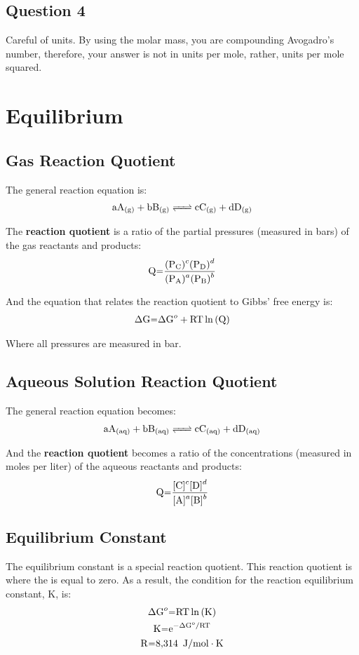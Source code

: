 \documentclass{article}
\begin{document}
\subsection*{Question 4}

Careful of units. By using the molar mass, you are compounding Avogadro's
number, therefore, your answer is not in units per mole, rather, units per mole
squared.

\section{Equilibrium}

\subsection{Gas Reaction Quotient}

The general reaction equation is:
\begin{gather*}
\ce{aA_{(g)} + bB_{(g)} <=> cC_{(g)} + dD_{(g)}}
\end{gather*}

The \textbf{reaction quotient} is a ratio of the partial pressures (measured in
bars) of the gas reactants and products:
\begin{gather*}
\ce{Q=\frac{(P_{C})^{c}(P_{D})^{d}}{(P_{A})^{a}(P_{B})^{b}}}
\end{gather*}

And the equation that relates the reaction quotient to Gibbs' free energy is:
\begin{gather*}
\ce{\Delta G=\Delta G^{o} + RT\ln(Q)}
\end{gather*}

Where all pressures are measured in bar.

\subsection{Aqueous Solution Reaction Quotient}

The general reaction equation becomes:
\begin{gather*}
\ce{aA_{(aq)} + bB_{(aq)} <=> cC_{(aq)} + dD_{(aq)}}
\end{gather*}

And the \textbf{reaction quotient} becomes a ratio of the concentrations
(measured in moles per liter) of the aqueous reactants and products:
\begin{gather*}
\ce{Q=\frac{[C]^{c}[D]^{d}}{[A]^{a}[B]^{b}}}
\end{gather*}

\subsection{Equilibrium Constant}

The equilibrium constant is a special reaction quotient. This reaction quotient
is where the  is equal to zero. As a result, the condition for the
reaction equilibrium constant, K, is: 
\begin{gather*}
\ce{\Delta G^{o}=RT\ln(K)}\\
\ce{K=e^{-\Delta G^{o}/RT}}\\
\ce{R=8,314\ J/mol\cdot K}
\end{gather*}
\end{document}
